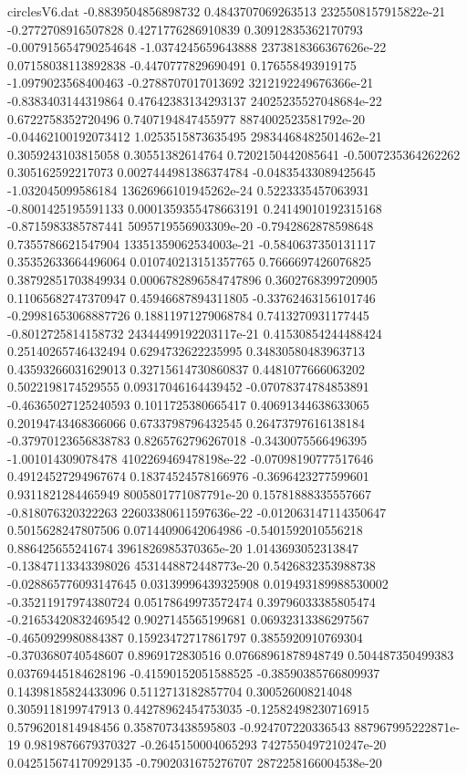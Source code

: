 \begin{filecontents}{circlesV6.dat}
-0.8839504856898732	0.4843707069263513	2325508157915822e-21
-0.2772708916507828	0.4271776286910839	0.30912835362170793
-0.007915654790254648	-1.0374245659643888	2373818366367626e-22
0.07158038113892838	-0.4470777829690491	0.176558493919175
-1.0979023568400463	-0.2788707017013692	3212192249676366e-21
-0.8383403144319864	0.47642383134293137	24025235527048684e-22
0.6722758352720496	0.7407194847455977	8874002523581792e-20
-0.04462100192073412	1.0253515873635495	29834468482501462e-21
0.3059243103815058	0.30551382614764	0.7202150442085641
-0.5007235364262262	0.305162592217073	0.0027444981386374784
-0.04835433089425645	-1.032045099586184	13626966101945262e-24
0.5223335457063931	-0.8001425195591133	0.0001359355478663191
0.24149010192315168	-0.8715983385787441	5095719556903309e-20
-0.7942862878598648	0.7355786621547904	13351359062534003e-21
-0.5840637350131117	0.35352633664496064	0.010740213151357765
0.7666697426076825	0.38792851703849934	0.0006782896584747896
0.3602768399720905	0.11065682747370947	0.45946687894311805
-0.33762463156101746	-0.29981653068887726	0.18811971279068784
0.7413270931177445	-0.8012725814158732	24344499192203117e-21
0.41530854244488424	0.25140265746432494	0.6294732622235995
0.34830580483963713	0.43593266031629013	0.32715614730860837
0.4481077666063202	0.5022198174529555	0.09317046164439452
-0.07078374784853891	-0.46365027125240593	0.1011725380665417
0.40691344638633065	0.20194743468366066	0.6733798796432545
0.26473797616138184	-0.37970123656838783	0.8265762796267018
-0.3430075566496395	-1.001014309078478	4102269469478198e-22
-0.07098190777517646	0.49124527294967674	0.18374524578166976
-0.3696423277599601	0.9311821284465949	8005801771087791e-20
0.15781888335557667	-0.818076320322263	22603380611597636e-22
-0.012063147114350647	0.5015628247807506	0.07144090642064986
-0.5401592010556218	0.886425655241674	3961826985370365e-20
1.0143693052313847	-0.13847113343398026	4531448872448773e-20
0.5426832353988738	-0.028865776093147645	0.03139996439325908
0.019493189988530002	-0.35211917974380724	0.05178649973572474
0.39796033385805474	-0.21653420832469542	0.9027145565199681
0.06932313386297567	-0.4650929980884387	0.15923472717861797
0.3855920910769304	-0.3703680740548607	0.8969172830516
0.07668961878948749	0.504487350499383	0.03769445184628196
-0.41590152051588525	-0.38590385766809937	0.14398185824433096
0.5112713182857704	0.300526008214048	0.3059118199747913
0.44278962454753035	-0.12582498230716915	0.5796201814948456
0.3587073438595803	-0.924707220336543	887967995222871e-19
0.9819876679370327	-0.2645150004065293	7427550497210247e-20
0.042515674170929135	-0.7902031675276707	2872258166004538e-20

\end{filecontents}
